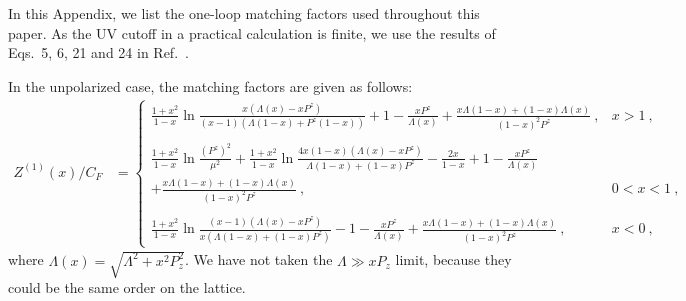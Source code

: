 
In this Appendix, we list the one-loop matching factors used throughout this paper. As the UV cutoff in a practical calculation is finite, we use the results of Eqs.~5, 6, 21 and 24 in Ref.~\cite{Xiong:2013bka}. 

In the unpolarized case, the matching factors are given as follows:
%
\begin{align}\label{unpolvertexnoexp}
Z^{(1)}(x)/C_F&=\left\{ \begin{array} {ll} \frac{1+x^2}{1-x}\ln \frac{x(\Lambda(x)-x P^z)}{(x-1)(\Lambda(1-x)+P^z(1-x))}+1-\frac{x P^z}{\Lambda(x)}+\frac{x\Lambda(1-x)+(1-x)\Lambda(x)}{(1-x)^2 P^z}\ , & x>1\ , \\
\ \\
\frac{1+x^2}{1-x}\ln\frac{(P^z)^2}{\mu^2}+\frac{1+x^2}{1-x}\ln \frac{4x(1-x)(\Lambda(x)-x P^z)}{\Lambda(1-x)+(1-x)P^z}-\frac{2x}{1-x}+1-\frac{x P^z}{\Lambda(x)}\ & \\
+\frac{x\Lambda(1-x)+(1-x)\Lambda(x)}{(1-x)^2 P^z}\ , & 0<x<1\ , \\
\ \\
\frac{1+x^2}{1-x}\ln \frac{(x-1)(\Lambda(x)-x P^z)}{x(\Lambda(1-x)+(1-x)P^z)}-1-\frac{x P^z}{\Lambda(x)}+\frac{x\Lambda(1-x)+(1-x)\Lambda(x)}{(1-x)^2P^z}\ , & x<0 \ ,\end{array} \right.
\end{align}
%
where $\Lambda(x) = \sqrt{\Lambda^2+x^2 P_z^2}$. We have not taken the $\Lambda \gg x P_z$ limit, because they could be the same order on the lattice.



